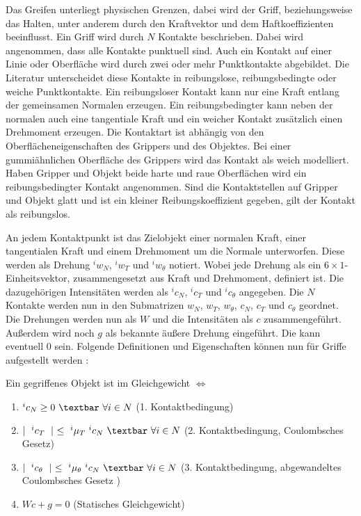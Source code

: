 Das Greifen unterliegt physischen Grenzen, dabei wird der Griff, beziehungsweise das Halten, unter anderem durch den Kraftvektor und dem Haftkoeffizienten beeinflusst. Ein Griff wird durch $N$ Kontakte beschrieben. Dabei wird angenommen, dass alle Kontakte punktuell sind. Auch ein Kontakt auf einer Linie oder Oberfläche wird durch zwei oder mehr Punktkontakte abgebildet. Die Literatur unterscheidet diese Kontakte in reibungslose, reibungsbedingte oder weiche Punktkontakte.\cite{salisbury1983kinematic} Ein reibungsloser Kontakt kann nur eine Kraft entlang der gemeinsamen Normalen erzeugen. Ein reibungsbedingter kann neben der normalen auch eine tangentiale Kraft und ein weicher Kontakt zusätzlich einen Drehmoment erzeugen. Die Kontaktart ist abhängig von den Oberflächeneigenschaften des Grippers und des Objektes. Bei einer gummiähnlichen Oberfläche des Grippers wird das Kontakt als weich modelliert. Haben Gripper und Objekt beide harte und raue Oberflächen wird ein reibungsbedingter Kontakt angenommen. Sind die Kontaktstellen auf Gripper und Objekt glatt und ist ein kleiner Reibungskoeffizient gegeben, gilt der Kontakt als reibungslos.\cite{bicchi2000robotic}

An jedem Kontaktpunkt ist das Zielobjekt einer normalen Kraft, einer tangentialen Kraft und einem Drehmoment um die Normale unterworfen. Diese werden als Drehung $^iw_N$, $^iw_T$ und $^iw_\theta$ notiert. Wobei jede Drehung als ein $6 \times 1$-Einheitsvektor, zusammengesetzt aus Kraft und Drehmoment, definiert ist. Die dazugehörigen Intensitäten werden als $^ic_N$, $^ic_T$ und $^ic_\theta$ angegeben. Die $N$ Kontakte werden nun in den Submatrizen $w_N$, $w_T$, $w_\theta$, $c_N$, $c_T$ und $c_\theta$ geordnet. Die Drehungen werden nun als $W$ und die Intensitäten als $c$ zusammengeführt. Außerdem wird noch $g$ als bekannte äußere Drehung eingeführt. Die kann eventuell 0 sein. Folgende Definitionen und Eigenschaften können nun für Griffe aufgestellt werden \cite{salisbury1983kinematic}:

Ein gegriffenes Objekt ist im Gleichgewicht $\Leftrightarrow$ 

\begin{enumerate}
	\item $^ic_N \geq 0 ~\textbar ~\forall i \in N $ (1. Kontaktbedingung)
	\item $\mid ~^ic_T ~\mid~ \leq ~^i\mu_T ~^ic_N ~\textbar~ \forall i \in N $ (2. Kontaktbedingung, Coulombsches Gesetz)
	\item $\mid ~^ic_\theta ~\mid ~\leq ~^i\mu_\theta ~^ic_N ~\textbar~ \forall i \in N $ (3. Kontaktbedingung, abgewandeltes Coulombsches Gesetz \cite{mason1985robot})
	\item $Wc+g=0$ (Statisches Gleichgewicht)
\end{enumerate}

